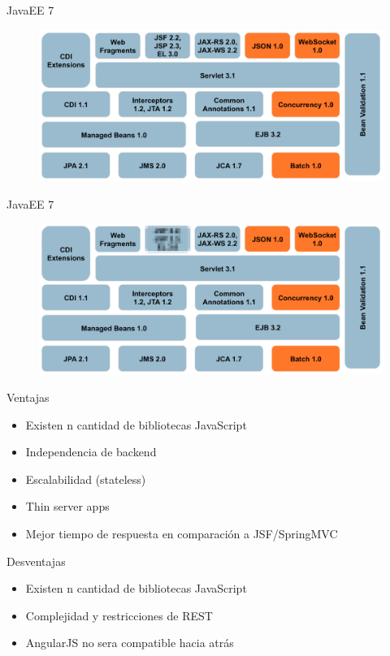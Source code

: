 \documentclass{beamer}
\begin{document}
\begin{frame}{JavaEE 7}
	\begin{figure}
\centering
\includegraphics[width=0.9\linewidth]{Images/javaee7-pancake.png}
\end{figure}

\end{frame}

\begin{frame}{JavaEE 7}
	\begin{figure}
\centering
\includegraphics[width=0.9\linewidth]{Images/javaee7-modern-pancake.png}
\end{figure}
\end{frame}

\begin{frame}{Ventajas}
	\begin{itemize}
		\item Existen n cantidad de bibliotecas JavaScript
		\item Independencia de backend
		\item Escalabilidad (stateless)
		\item Thin server apps
		\item Mejor tiempo de respuesta en comparación a JSF/SpringMVC
	\end{itemize}
\end{frame}

\begin{frame}{Desventajas}
	\begin{itemize}
		\item Existen n cantidad de bibliotecas JavaScript
		\item Complejidad y restricciones de REST
		\item AngularJS no sera compatible hacia atrás
	\end{itemize}
\end{frame}
\end{document}
